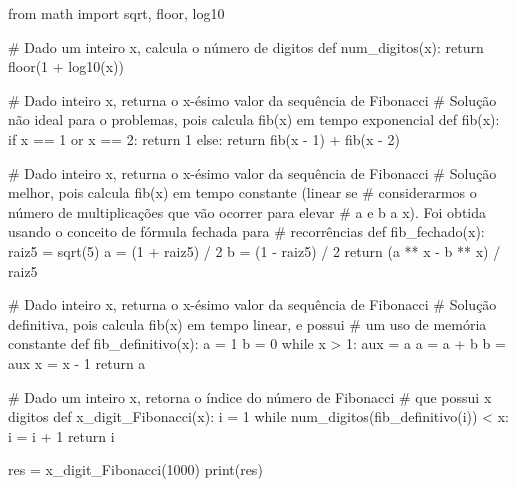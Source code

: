             from math import sqrt, floor, log10

            # Dado um inteiro x, calcula o número de digitos
            def num_digitos(x):
                return floor(1 + log10(x))

            # Dado inteiro x, returna o x-ésimo valor da sequência de Fibonacci
            # Solução não ideal para o problemas, pois calcula fib(x) em tempo exponencial
            def fib(x):
                if x == 1 or x == 2:
                    return 1
                else:
                    return fib(x - 1) + fib(x - 2) 

            # Dado inteiro x, returna o x-ésimo valor da sequência de Fibonacci
            # Solução melhor, pois calcula fib(x) em tempo constante (linear se 
            # considerarmos o número de multiplicações que vão ocorrer para elevar
            # a e b a x). Foi obtida usando o conceito de fórmula fechada para 
            # recorrências
            def fib_fechado(x):
                raiz5 = sqrt(5)
                a = (1 + raiz5) / 2
                b = (1 - raiz5) / 2
                return (a ** x - b ** x) / raiz5

            # Dado inteiro x, returna o x-ésimo valor da sequência de Fibonacci
            # Solução definitiva, pois calcula fib(x) em tempo linear, e possui 
            # um uso de memória constante
            def fib_definitivo(x):
                a = 1
                b = 0
                while x > 1:
                    aux = a
                    a = a + b
                    b = aux
                    x = x - 1
                return a

            # Dado um inteiro x, retorna o índice do número de Fibonacci 
            # que possui x digitos
            def x_digit_Fibonacci(x):
                i = 1
                while num_digitos(fib_definitivo(i)) < x:
                    i = i + 1
                return i

            res = x_digit_Fibonacci(1000)
            print(res)

